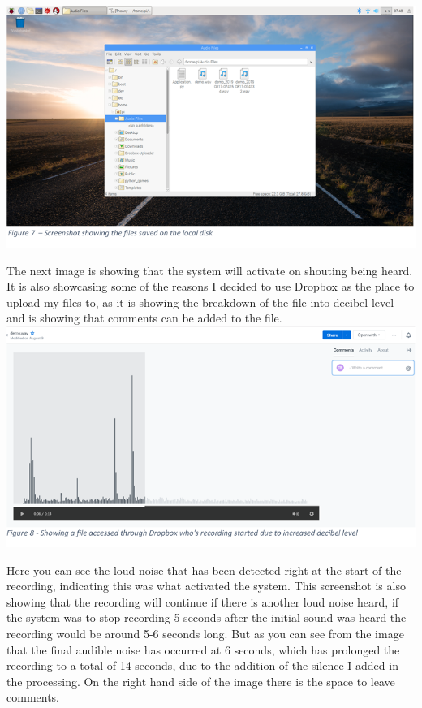 \documentclass[a4paper,11pt]{report}
\begin{document}
\includegraphics{Screenshot2.PNG}

The next image is showing that the system will activate on shouting being heard. It is also showcasing some of the reasons I decided to use Dropbox as the place to upload my files to, as it is showing the breakdown of the file into decibel level and is showing that comments can be added to the file.\\

\includegraphics{Screenshot3.PNG}

Here you can see the loud noise that has been detected right at the start of the recording, indicating this was what activated the system. This screenshot is also showing that the recording will continue if there is another loud noise heard, if the system was to stop recording 5 seconds after the initial sound was heard the recording would be around 5-6 seconds long. But as you can see from the image that the final audible noise has occurred at 6 seconds, which has prolonged the recording to a total of 14 seconds, due to the addition of the silence I added in the processing. On the right hand side of the image there is the space to leave comments. \\
\end{document}
